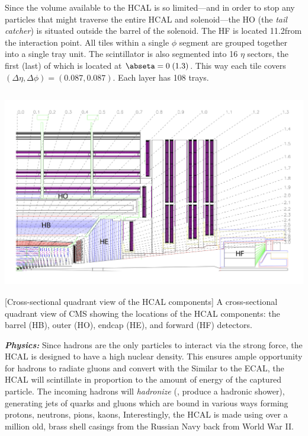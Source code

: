Since the volume available to the HCAL is so limited---and in order to stop any particles that might traverse the entire HCAL and solenoid---the HO (the \emph{tail catcher}) is situated outside the barrel of the solenoid.
The HF is located 11.2\meter from the interaction point.
All tiles within a single $\phi$ segment are grouped together into a single tray unit.
The scintillator is also segmented into 16 $\eta$ sectors, the first (last) of which is located at $\abseta = 0\;(1.3)$.
This way each tile covers $(\Delta \eta, \Delta \phi) = (0.087, 0.087)$.
Each layer has 108 trays.
\begin{multiFigure}
    \centering
    \includegraphics[height=9cm]{figures/cms/hcal/hcal_quadrants_longitudinalview.jpg}
        [Cross-sectional quadrant view of the HCAL components]
        {A cross-sectional quadrant view of CMS showing the locations of the HCAL components:
        the barrel (HB), outer (HO), endcap (HE), and forward (HF) detectors.}
    \label{fig:hcal_quadrant}
\end{multiFigure}

\textit{\textbf{Physics:}}
Since hadrons are the only particles to interact via the strong force, the HCAL is designed to have a high nuclear density.
This ensures ample opportunity for hadrons to radiate gluons and convert  with the Similar to the ECAL, the HCAL will scintillate in proportion to the amount of energy of the captured particle. 
The incoming hadrons will \emph{hadronize} (\ie, produce a hadronic shower), generating jets of quarks and gluons which are bound in various ways forming protons, neutrons, pions, kaons, \etc
Interestingly, the HCAL is made using over a million old, brass shell casings from the Russian Navy back from World War II.

